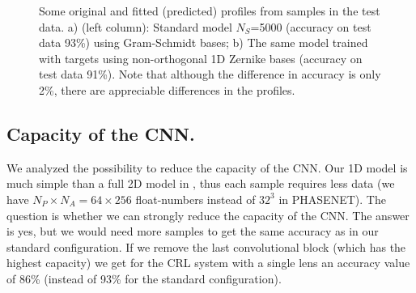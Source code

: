 \documentclass[preprint]{iucr}
\begin{document}
\begin{figure}

 

    


    \caption{Some original and fitted (predicted) profiles from samples in the test data. a) (left column): Standard model $N_S$=5000 (accuracy on test  data 93\%) using Gram-Schmidt bases;
    b) The same model trained with targets using  non-orthogonal 1D Zernike bases (accuracy on test  data 91\%). Note that although the difference in accuracy is only 2\%, there are appreciable differences in the profiles.
    }
\end{figure}


\subsection{Capacity of the CNN.}
We analyzed the possibility to reduce the capacity of the CNN. Our 1D model is much simple than a full 2D model in \cite{Saha2020}, thus each sample requires less data (we have $N_P\times N_A=64\times 256$ float-numbers instead of $32^3$ in PHASENET). The question is whether we can strongly reduce the capacity of the CNN. The answer is yes, but we would need more samples to get the same accuracy as in our standard configuration. If we remove the last convolutional block (which has the highest capacity) we get for the CRL system with a single lens an accuracy value of 86\% (instead of 93\% for the standard configuration).
\end{document}
